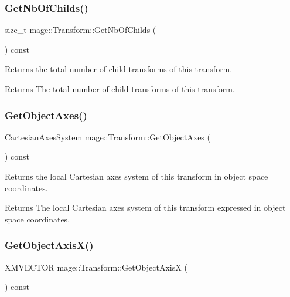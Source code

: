 \subsubsection{\texorpdfstring{Get\+Nb\+Of\+Childs()}{GetNbOfChilds()}}
{\footnotesize\ttfamily size\+\_\+t mage\+::\+Transform\+::\+Get\+Nb\+Of\+Childs (\begin{DoxyParamCaption}{ }\end{DoxyParamCaption}) const}

Returns the total number of child transforms of this transform.

\begin{DoxyReturn}{Returns}
The total number of child transforms of this transform. 
\end{DoxyReturn}
\hypertarget{structmage_1_1_transform_a814f749d70104ec5732a741b0b2b7220}{}\label{structmage_1_1_transform_a814f749d70104ec5732a741b0b2b7220} 
\subsubsection{\texorpdfstring{Get\+Object\+Axes()}{GetObjectAxes()}}
{\footnotesize\ttfamily \hyperlink{structmage_1_1_cartesian_axes_system}{Cartesian\+Axes\+System} mage\+::\+Transform\+::\+Get\+Object\+Axes (\begin{DoxyParamCaption}{ }\end{DoxyParamCaption}) const}

Returns the local Cartesian axes system of this transform in object space coordinates.

\begin{DoxyReturn}{Returns}
The local Cartesian axes system of this transform expressed in object space coordinates. 
\end{DoxyReturn}
\hypertarget{structmage_1_1_transform_a1817e9ff4397b5a107541b92a01b91fc}{}\label{structmage_1_1_transform_a1817e9ff4397b5a107541b92a01b91fc} 
\subsubsection{\texorpdfstring{Get\+Object\+Axis\+X()}{GetObjectAxisX()}}
{\footnotesize\ttfamily X\+M\+V\+E\+C\+T\+OR mage\+::\+Transform\+::\+Get\+Object\+AxisX (\begin{DoxyParamCaption}{ }\end{DoxyParamCaption}) const}

